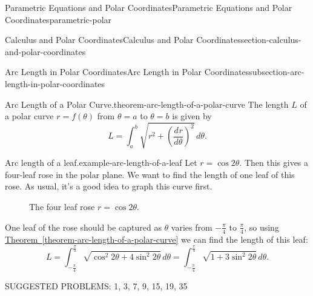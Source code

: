 \documentclass[oneside,10pt,]{book}
\numberwithin{equation}{section}
\newcommand{\dv}[3][]{\dfrac{d^{#1} #2}{d #3^{#1}}}
\begin{document}
\begin{chapterptx}{Parametric Equations and Polar Coordinates}{}{Parametric Equations and Polar Coordinates}{}{}{parametric-polar}
\begin{sectionptx}{Calculus and Polar Coordinates}{}{Calculus and Polar Coordinates}{}{}{section-calculus-and-polar-coordinates}
\begin{subsectionptx}{Arc Length in Polar Coordinates}{}{Arc Length in Polar Coordinates}{}{}{subsection-arc-length-in-polar-coordinates}
\begin{theorem}{Arc Length of a Polar Curve.}{}{theorem-arc-length-of-a-polar-curve}
The length \(L\) of a polar curve \(r = f(\theta)\) from \(\theta=a\) to \(\theta=b\) is given by%
\begin{equation*}
L = \int_{a}^{b}\sqrt{r^{2} + \left(\dv{r}{\theta}\right)^{2}}\,d\theta.
\end{equation*}
%
\end{theorem}
\begin{example}{Arc length of a leaf.}{example-arc-length-of-a-leaf}%
\hypertarget{p-1058}{}%
Let \(r = \cos2\theta\). Then this gives a four-leaf rose in the polar plane. We want to find the length of one leaf of this rose. As usual, it's a good idea to graph this curve first.%
\begin{figure}
\centering
{
}
\caption{The four leaf rose \(r=\cos2\theta\).\label{figure-rose}}
\end{figure}
\hypertarget{p-1059}{}%
One leaf of the rose should be captured as \(\theta\) varies from \(-\frac{\pi}{4}\) to \(\frac{\pi}{4}\), so using \hyperref[theorem-arc-length-of-a-polar-curve]{Theorem~\ref{theorem-arc-length-of-a-polar-curve}} we can find the length of this leaf:%
%
\begin{equation*}
L = \int_{-\frac{\pi}{4}}^{\frac{\pi}{4}}\sqrt{\cos^{2}2\theta + 4\sin^{2}2\theta}\,d\theta = \int_{-\frac{\pi}{4}}^{\frac{\pi}{4}}\sqrt{1 + 3\sin^{2}2\theta}\,d\theta.
\end{equation*}
\end{example}
\hypertarget{p-1060}{}%
SUGGESTED PROBLEMS: 1, 3, 7, 9, 15, 19, 35%
\end{subsectionptx}
\end{sectionptx}
\end{chapterptx}
\end{document}

